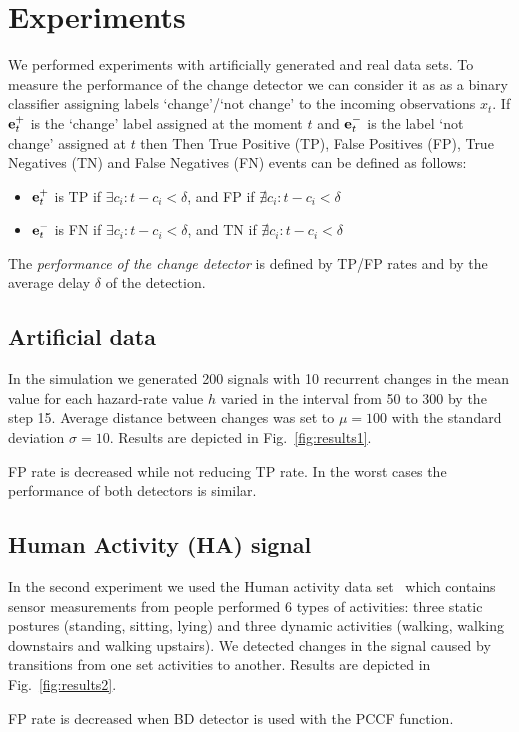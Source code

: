 \section{Experiments}
\label{sec:experiments}
We performed experiments with artificially generated and real
data sets.
To measure the performance of the change detector we can consider it as as a binary classifier assigning labels `change'/`not change' to the incoming observations $x_t$.
If
$\mathbf{e}_{t}^{+}$ is the `change' label assigned at the moment $t$
and
$\mathbf{e}_{t}^{-}$ is the label `not change' assigned at $t$
then
Then True Positive (TP), False Positives (FP), True Negatives (TN) and False Negatives (FN) events can be defined as follows:
\begin{itemize}[leftmargin=*]\setlength\itemsep{0em}
    \item $\mathbf{e}_{t}^{+}$ is TP if $\exists c_i:t-c_i<\delta$, and FP if $\nexists c_i:t-c_i<\delta$
    \item $\mathbf{e}_{t}^{-}$ is FN if $\exists c_i:t-c_i <\delta$, and TN if $\nexists c_i:t-c_i<\delta$
\end{itemize}
The \textit{performance of the change detector} is defined by TP/FP rates and by the average delay $\delta$ of the detection.

\subsection{Artificial data}
In the simulation we generated 200 signals with 10 recurrent changes in the mean value for each hazard-rate value $h$ varied in the interval from 50 to 300 by the step 15.
Average distance between changes was set to $\mu = 100$ with the standard deviation $\sigma = 10$.
%
Results are depicted in Fig.~\ref{fig:results1}.
%

FP rate is decreased while not reducing TP rate.
In the worst cases the performance of both detectors is similar.

\subsection{Human Activity (HA) signal}
In the second experiment we used the Human activity data set~\cite{reyes2016transition} which contains sensor measurements from people performed 6 types of activities: three static postures (standing, sitting, lying) and three dynamic activities (walking, walking downstairs and walking
upstairs).
We detected changes in the signal caused by transitions from one set activities to another.
Results are depicted in Fig.~\ref{fig:results2}.

FP rate is decreased when BD detector is used with the PCCF function.


